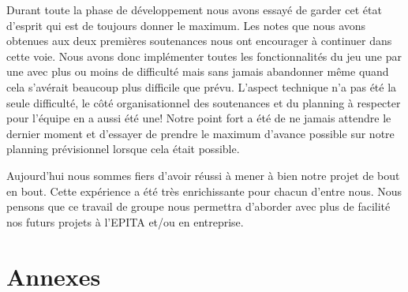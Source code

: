 \documentclass[11pt]{report}
\begin{document}
Durant toute la phase de développement nous avons essayé de garder cet état d'esprit qui est de toujours donner le maximum. Les notes que nous avons obtenues aux deux premières soutenances nous ont encourager à continuer dans cette voie. Nous avons donc implémenter toutes les fonctionnalités du jeu une par une avec plus ou moins de difficulté mais sans jamais abandonner même quand cela s'avérait beaucoup plus difficile que prévu. L'aspect technique n'a pas été la seule difficulté, le côté organisationnel des soutenances et du planning à respecter pour l'équipe en a aussi été une! Notre point fort a été de ne jamais attendre le dernier moment et d'essayer de prendre le maximum d'avance possible sur notre planning prévisionnel lorsque cela était possible.

Aujourd'hui nous sommes fiers d'avoir réussi à mener à bien notre projet de bout en bout. Cette expérience a été très enrichissante pour chacun d'entre nous. Nous pensons que ce travail de groupe nous permettra d'aborder avec plus de facilité nos futurs projets à l'EPITA et/ou en entreprise.

\newpage
{}
\part*{Annexes}

\newpage
\listoffigures

\newpage
\tableofcontents
 
\end{document}
